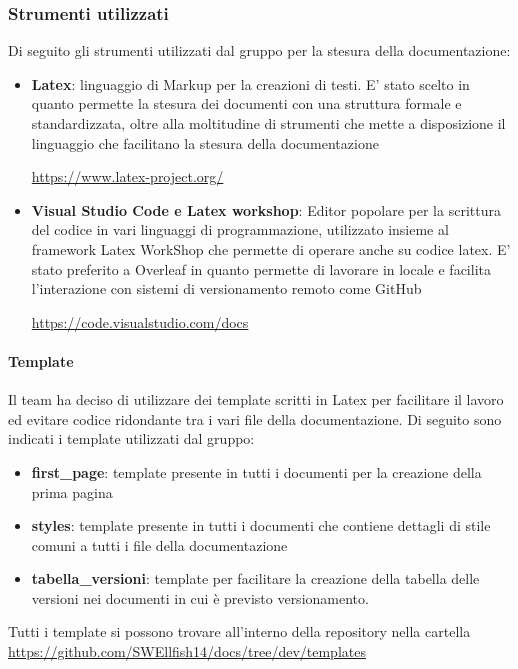 \documentclass[12pt]{article}
\begin{document}
       

\subsubsection{Strumenti utilizzati}
Di seguito gli strumenti utilizzati dal gruppo per la stesura della documentazione:
\begin{itemize}
    \item \textbf{Latex}: linguaggio di Markup per la creazioni di testi. E' stato scelto in quanto permette la stesura dei documenti con una struttura formale e standardizzata, oltre alla moltitudine di strumenti che mette a disposizione il linguaggio che facilitano la stesura della documentazione
          \begin{center}
              \url{https://www.latex-project.org/}
          \end{center}
    \item \textbf{Visual Studio Code e Latex workshop}: Editor popolare per la scrittura del codice in vari linguaggi di programmazione, utilizzato insieme al framework Latex WorkShop che permette di operare anche su codice latex. E' stato preferito a Overleaf in quanto permette di lavorare in locale e facilita l'interazione con sistemi di versionamento remoto come GitHub
          \begin{center}
              \url{https://code.visualstudio.com/docs}
          \end{center}
\end{itemize}


\paragraph{Template}
\label{Temp}
Il team ha deciso di utilizzare dei template scritti in Latex per facilitare il lavoro ed evitare codice ridondante tra i vari file della documentazione.
Di seguito sono indicati i template utilizzati dal gruppo:
\begin{itemize}
    \item \textbf{first\_page}: template presente in tutti i documenti per la creazione della prima pagina
    \item \textbf{styles}: template presente in tutti i documenti che contiene dettagli di stile comuni a tutti i file della documentazione
    \item \textbf{tabella\_versioni}: template per facilitare la creazione della tabella delle versioni nei documenti in cui è previsto versionamento.

\end{itemize}
Tutti i template si possono trovare all'interno della repository nella cartella \url{https://github.com/SWEllfish14/docs/tree/dev/templates}
\end{document}
